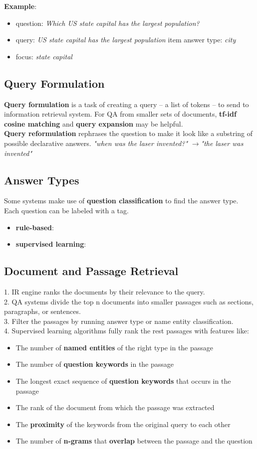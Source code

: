 \documentclass[a4paper, 12pt]{book} %
\begin{document}
\textbf{Example}:
\begin{itemize}
	\item question: \emph{Which US state capital has the largest population?}
	\item query: \emph{US state capital has the largest population}
	item answer type: \emph{city}
	\item focus: \emph{state capital}
\end{itemize}

\subsection{Query Formulation}
\textbf{Query formulation} is a task of creating a query -- a list of tokens -- to send to information retrieval system. For QA from smaller	sets of documents, \textbf{tf-idf cosine matching} and \textbf{query expansion} may be helpful. \\
\textbf{Query reformulation} rephrases the question to
make it look like a substring of possible declarative answers. \emph{"when was the laser invented?"} $\to$\emph{"the laser was invented"}

\subsection{Answer Types}
Some systems make use of \textbf{question classification} to find the answer type. Each question can be labeled with a tag.

\begin{itemize}
	\item \textbf{rule-based}:
	\item \textbf{supervised learning}:
\end{itemize}

\subsection{Document and Passage Retrieval}
1. IR engine ranks the documents by their relevance to the query. \\
2. QA systems divide the top n documents into smaller passages such
as sections, paragraphs, or sentences.\\
3. Filter the passages by running answer type or name entity classification. \\
4. Supervised learning algorithms fully rank the rest passages with features like:
\begin{itemize}
	\item The number of \textbf{named entities} of the right type in the passage
	\item The number of \textbf{question keywords} in the passage
	\item The longest exact sequence of \textbf{question keywords} that occurs in the passage
	\item The rank of the document from which the passage was extracted
	\item The \textbf{proximity} of the keywords from the original query to each other
	\item The number of \textbf{n-grams} that \textbf{overlap} between the passage and the question
\end{itemize} 
\end{document}

